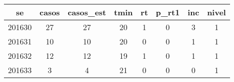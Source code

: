 \begin{tabular}{c|ccccccc}
  \hline
se & casos & casos\_est & tmin & rt & p\_rt1 & inc & nivel \\ 
  \hline
201630 & 27 & 27 & 20 & 1 & 0 & 3 & 1 \\ 
  201631 & 10 & 10 & 20 & 0 & 0 & 1 & 1 \\ 
  201632 & 12 & 12 & 19 & 1 & 0 & 1 & 1 \\ 
  201633 & 3 & 4 & 21 & 0 & 0 & 0 & 1 \\ 
   \hline
\end{tabular}
